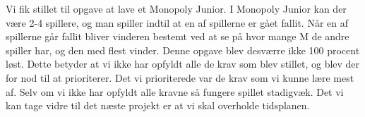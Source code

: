 \begin{flushleft} %
\doublespacing


Vi fik stillet til opgave at lave et Monopoly Junior. I Monopoly Junior kan der være 2-4 spillere, og man spiller indtil at en af spillerne er gået fallit. Når en af spillerne går fallit bliver vinderen bestemt ved at se på hvor mange M de andre spiller har, og den med flest vinder. 
\addlinespace %
\addlinespace
Denne opgave blev desværre ikke 100 procent løst. Dette betyder at vi ikke har opfyldt alle de krav som blev stillet, og blev der for nod til at prioriterer. Det vi prioriterede var de krav som vi kunne lære mest af. Selv om vi ikke har opfyldt alle kravne så fungere spillet stadigvæk. Det vi kan tage vidre til det næste projekt er at vi skal overholde tidsplanen.



\end{flushleft}